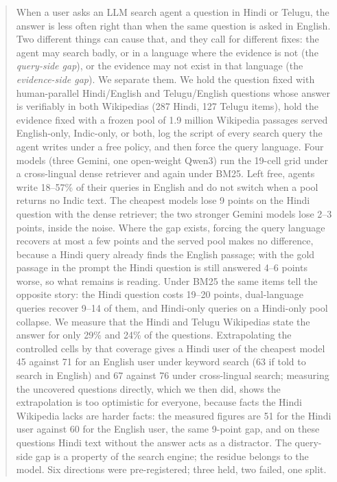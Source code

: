 \begin{abstract}
When a user asks an LLM search agent a question in Hindi or Telugu, the answer is less often right than when the same question is asked in English. Two different things can cause that, and they call for different fixes: the agent may search badly, or in a language where the evidence is not (the \emph{query-side gap}), or the evidence may not exist in that language (the \emph{evidence-side gap}). We separate them. We hold the question fixed with human-parallel Hindi/English and Telugu/English questions whose answer is verifiably in both Wikipedias (287 Hindi, 127 Telugu items), hold the evidence fixed with a frozen pool of 1.9 million Wikipedia passages served English-only, Indic-only, or both, log the script of every search query the agent writes under a free policy, and then force the query language. Four models (three Gemini, one open-weight Qwen3) run the 19-cell grid under a cross-lingual dense retriever and again under BM25. Left free, agents write 18--57\% of their queries in English and do not switch when a pool returns no Indic text. The cheapest models lose 9 points on the Hindi question with the dense retriever; the two stronger Gemini models lose 2--3 points, inside the noise. Where the gap exists, forcing the query language recovers at most a few points and the served pool makes no difference, because a Hindi query already finds the English passage; with the gold passage in the prompt the Hindi question is still answered 4--6 points worse, so what remains is reading. Under BM25 the same items tell the opposite story: the Hindi question costs 19--20 points, dual-language queries recover 9--14 of them, and Hindi-only queries on a Hindi-only pool collapse. We measure that the Hindi and Telugu Wikipedias state the answer for only 29\% and 24\% of the questions. Extrapolating the controlled cells by that coverage gives a Hindi user of the cheapest model 45 against 71 for an English user under keyword search (63 if told to search in English) and 67 against 76 under cross-lingual search; measuring the uncovered questions directly, which we then did, shows the extrapolation is too optimistic for everyone, because facts the Hindi Wikipedia lacks are harder facts: the measured figures are 51 for the Hindi user against 60 for the English user, the same 9-point gap, and on these questions Hindi text without the answer acts as a distractor. The query-side gap is a property of the search engine; the residue belongs to the model. Six directions were pre-registered; three held, two failed, one split.
\end{abstract}

